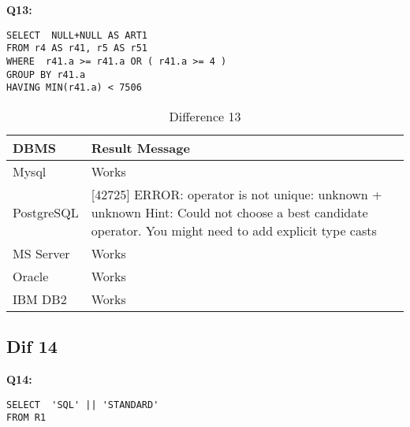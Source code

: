 \textbf{Q13:}
\begin{mdframed}[backgroundcolor=lightgray!20]
\begin{lstlisting}[style=SQL]
SELECT  NULL+NULL AS ART1
FROM r4 AS r41, r5 AS r51
WHERE  r41.a >= r41.a OR ( r41.a >= 4 )
GROUP BY r41.a
HAVING MIN(r41.a) < 7506
\end{lstlisting}
\end{mdframed}

\begin{table}[h]
\centering
\caption{Difference 13}
\label{my-label}
\begin{tabular}{|p{2cm}|p{11.5cm}| }
\hline
\textbf{DBMS} & \textbf{Result Message}                                                                                                                                  \\ \hline
Mysql         & Works                                                                                                                                                    \\ \hline
PostgreSQL    & {[}42725{]} ERROR: operator is not unique: unknown + unknown Hint: Could not choose a best candidate operator. You might need to add explicit type casts \\ \hline
MS Server     & Works                                                                                                                                                    \\ \hline
Oracle        & Works                                                                                                                                                    \\ \hline
IBM DB2       & Works                                                                                                                                                    \\ \hline
\end{tabular}
\end{table}

\hfill\newpage
\subsection{Dif 14}

\textbf{Q14:}
\begin{mdframed}[backgroundcolor=lightgray!20]
\begin{lstlisting}[style=SQL]
SELECT  'SQL' || 'STANDARD'
FROM R1
\end{lstlisting}
\end{mdframed}
 
